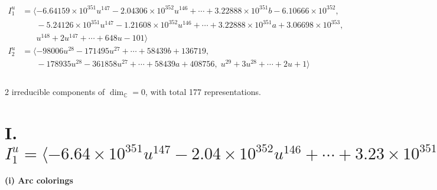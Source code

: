\documentclass[1p]{elsarticle_modified}
\theoremstyle{definition}
\begin{document}
\begin{align*}
I^u_{1}&=\langle 
-6.64159\times10^{351} u^{147}-2.04306\times10^{352} u^{146}+\cdots+3.22888\times10^{351} b-6.10666\times10^{352},\\
\phantom{I^u_{1}}&\phantom{= \langle  }-5.24126\times10^{351} u^{147}-1.21608\times10^{352} u^{146}+\cdots+3.22888\times10^{351} a+3.06698\times10^{353},\\
\phantom{I^u_{1}}&\phantom{= \langle  }u^{148}+2 u^{147}+\cdots+648 u-101\rangle \\
I^u_{2}&=\langle 
-98006 u^{28}-171495 u^{27}+\cdots+58439 b+136719,\\
\phantom{I^u_{2}}&\phantom{= \langle  }-178935 u^{28}-361858 u^{27}+\cdots+58439 a+408756,\;u^{29}+3 u^{28}+\cdots+2 u+1\rangle \\
\\
\end{align*}
\raggedright * 2 irreducible components of $\dim_{\mathbb{C}}=0$, with total 177 representations.\\
\newpage
\renewcommand{\arraystretch}{1}
\centering \section*{I. $I^u_{1}= \langle -6.64\times10^{351} u^{147}-2.04\times10^{352} u^{146}+\cdots+3.23\times10^{351} b-6.11\times10^{352},\;-5.24\times10^{351} u^{147}-1.22\times10^{352} u^{146}+\cdots+3.23\times10^{351} a+3.07\times10^{353},\;u^{148}+2 u^{147}+\cdots+648 u-101 \rangle$}
\flushleft \textbf{(i) Arc colorings}\\
\end{document}
